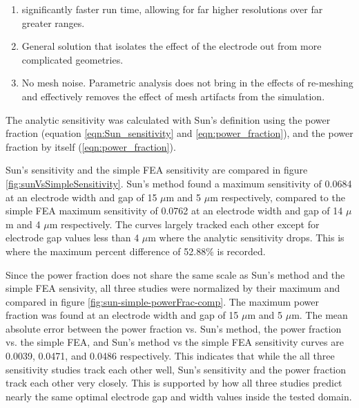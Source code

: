 \begin{enumerate}
	\item significantly faster run time, allowing for far higher resolutions over far greater ranges.
	\item General solution that isolates the effect of the electrode out from more complicated geometries.
	\item No mesh noise. Parametric analysis does not bring in the effects of re-meshing and effectively removes the effect of mesh artifacts from the simulation.
\end{enumerate}

\noindent The analytic sensitivity was calculated with Sun's definition using the power fraction (equation \ref{eqn:Sun_sensitivity} and \ref{eqn:power_fraction}), and the power fraction by itself (\ref{eqn:power_fraction}). 

\par Sun's sensitivity and the simple FEA sensitivity are compared in figure \ref{fig:sunVsSimpleSensitivity}. Sun's method found a maximum sensitivity of 0.0684 at an electrode width and gap of 15 $\mu$m and 5 $\mu$m respectively, compared to the simple FEA maximum sensitivity of 0.0762 at an electrode width and gap of 14 $\mu$m and 4 $\mu$m respectively. The curves largely tracked each other except for electrode gap values less than 4 $\mu$m where the analytic sensitivity drops. This is where the maximum percent difference of 52.88\% is recorded. 
\par Since the power fraction does not share the same scale as Sun's method and the simple FEA sensivity, all three studies were normalized by their maximum and compared in figure \ref{fig:sun-simple-powerFrac-comp}. The maximum power fraction was found at an electrode width and gap of 15 $\mu$m and 5 $\mu$m. The mean absolute error between the power fraction vs. Sun's method, the power fraction vs. the simple FEA, and Sun's method vs the simple FEA sensitivity curves are 0.0039, 0.0471, and 0.0486 respectively. This indicates that while the all three sensitivity studies track each other well, Sun's sensitivity and the power fraction track each other very closely. This is supported by how all three studies predict nearly the same optimal electrode gap and width values inside the tested domain. 



